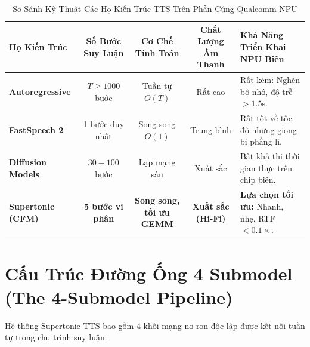 \documentclass[11pt,a4paper,oneside,table]{report}
\begin{document}
\begin{table}[t]
\centering
\small
\sffamily
\caption{So Sánh Kỹ Thuật Các Họ Kiến Trúc TTS Trên Phần Cứng Qualcomm NPU}
\label{tab:tts_comparison}
\vspace{2mm}
\begin{tabularx}{\textwidth}{l c c c X}
\toprule
\textbf{Họ Kiến Trúc} & \textbf{Số Bước Suy Luận} & \textbf{Cơ Chế Tính Toán} & \textbf{Chất Lượng Âm Thanh} & \textbf{Khả Năng Triển Khai NPU Biên} \\
\midrule
\textbf{Autoregressive} & $T \ge 1000$ bước & Tuần tự $O(T)$ & Rất cao & Rất kém: Nghẽn bộ nhớ, độ trễ $> 1.5\text{s}$. \\
\addlinespace
\textbf{FastSpeech 2} & 1 bước duy nhất & Song song $O(1)$ & Trung bình & Rất tốt về tốc độ nhưng giọng bị phẳng lì. \\
\addlinespace
\textbf{Diffusion Models} & $30 - 100$ bước & Lặp mạng sâu & Xuất sắc & Bất khả thi thời gian thực trên chip biên. \\
\addlinespace
\textbf{Supertonic (CFM)} & \textbf{5 bước vi phân} & \textbf{Song song, tối ưu GEMM} & \textbf{Xuất sắc (Hi-Fi)} & \textbf{Lựa chọn tối ưu:} Nhanh, nhẹ, RTF $< 0.1\times$. \\
\bottomrule
\end{tabularx}
\end{table}

\section{Cấu Trúc Đường Ống 4 Submodel (The 4-Submodel Pipeline)}
\label{sec:pipeline_structure}

Hệ thống Supertonic TTS bao gồm 4 khối mạng nơ-ron độc lập được kết nối tuần tự trong chu trình suy luận:
\end{document}
